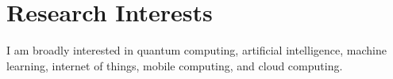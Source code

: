 
\section{\sc Research Interests}

I am broadly interested in quantum computing, artificial intelligence, machine learning, internet of things, mobile computing, and cloud computing.




